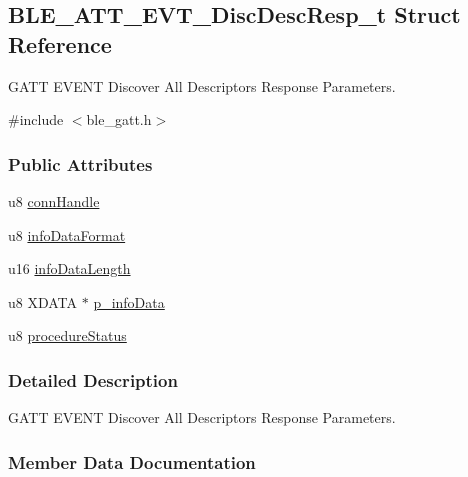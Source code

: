 \hypertarget{struct_b_l_e___a_t_t___e_v_t___disc_desc_resp__t}{}\subsection{B\+L\+E\+\_\+\+A\+T\+T\+\_\+\+E\+V\+T\+\_\+\+Disc\+Desc\+Resp\+\_\+t Struct Reference}
\label{struct_b_l_e___a_t_t___e_v_t___disc_desc_resp__t}


G\+A\+TT E\+V\+E\+NT Discover All Descriptors Response Parameters.  




{\ttfamily \#include $<$ble\+\_\+gatt.\+h$>$}

\subsubsection*{Public Attributes}
\begin{DoxyCompactItemize}
\item 
u8 \hyperlink{struct_b_l_e___a_t_t___e_v_t___disc_desc_resp__t_a569ee92f29f136b40ba235f30e119eb7}{conn\+Handle}
\item 
u8 \hyperlink{struct_b_l_e___a_t_t___e_v_t___disc_desc_resp__t_addd8b0f584b2cafeb7525c8ee1a44b26}{info\+Data\+Format}
\item 
u16 \hyperlink{struct_b_l_e___a_t_t___e_v_t___disc_desc_resp__t_aa2a3a11ba603a25723ac9903d473910a}{info\+Data\+Length}
\item 
u8 X\+D\+A\+TA $\ast$ \hyperlink{struct_b_l_e___a_t_t___e_v_t___disc_desc_resp__t_adffe04faceff762aa8b38387610f93c3}{p\+\_\+info\+Data}
\item 
u8 \hyperlink{struct_b_l_e___a_t_t___e_v_t___disc_desc_resp__t_a1baf06a205c2b4a8b43de44fc4a0c81c}{procedure\+Status}
\end{DoxyCompactItemize}


\subsubsection{Detailed Description}
G\+A\+TT E\+V\+E\+NT Discover All Descriptors Response Parameters. 

\subsubsection{Member Data Documentation}
